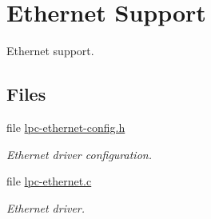 \hypertarget{group__lpc__eth}{}\section{Ethernet Support}
\label{group__lpc__eth}


Ethernet support.  


\subsection*{Files}
\begin{DoxyCompactItemize}
\item 
file \mbox{\hyperlink{lpc32xx_2include_2bsp_2lpc-ethernet-config_8h}{lpc-\/ethernet-\/config.\+h}}
\begin{DoxyCompactList}\small\item\em Ethernet driver configuration. \end{DoxyCompactList}\item 
file \mbox{\hyperlink{lpc-ethernet_8c}{lpc-\/ethernet.\+c}}
\begin{DoxyCompactList}\small\item\em Ethernet driver. \end{DoxyCompactList}\end{DoxyCompactItemize}
